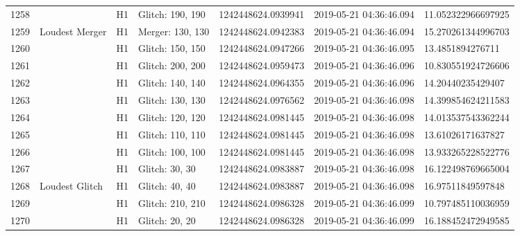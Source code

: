 \begin{longtable}{lllllll}
1258 &                                                    &       H1 &  Glitch: 190, 190 &  1242448624.0939941 &  2019-05-21 04:36:46.094 &  11.052322966697925 \\
1259 &                                     Loudest Merger &       H1 &  Merger: 130, 130 &  1242448624.0942383 &  2019-05-21 04:36:46.094 &  15.270261344996703 \\
1260 &                                                    &       H1 &  Glitch: 150, 150 &  1242448624.0947266 &  2019-05-21 04:36:46.095 &    13.4851894276711 \\
1261 &                                                    &       H1 &  Glitch: 200, 200 &  1242448624.0959473 &  2019-05-21 04:36:46.096 &  10.830551924726606 \\
1262 &                                                    &       H1 &  Glitch: 140, 140 &  1242448624.0964355 &  2019-05-21 04:36:46.096 &   14.20440235429407 \\
1263 &                                                    &       H1 &  Glitch: 130, 130 &  1242448624.0976562 &  2019-05-21 04:36:46.098 &  14.399854624211583 \\
1264 &                                                    &       H1 &  Glitch: 120, 120 &  1242448624.0981445 &  2019-05-21 04:36:46.098 &  14.013537543362244 \\
1265 &                                                    &       H1 &  Glitch: 110, 110 &  1242448624.0981445 &  2019-05-21 04:36:46.098 &   13.61026171637827 \\
1266 &                                                    &       H1 &  Glitch: 100, 100 &  1242448624.0981445 &  2019-05-21 04:36:46.098 &  13.933265228522776 \\
1267 &                                                    &       H1 &    Glitch: 30, 30 &  1242448624.0983887 &  2019-05-21 04:36:46.098 &  16.122498769665004 \\
1268 &                                     Loudest Glitch &       H1 &    Glitch: 40, 40 &  1242448624.0983887 &  2019-05-21 04:36:46.098 &   16.97511849597848 \\
1269 &                                                    &       H1 &  Glitch: 210, 210 &  1242448624.0986328 &  2019-05-21 04:36:46.099 &  10.797485110036959 \\
1270 &                                                    &       H1 &    Glitch: 20, 20 &  1242448624.0986328 &  2019-05-21 04:36:46.099 &  16.188452472949585 \\

\end{longtable}
